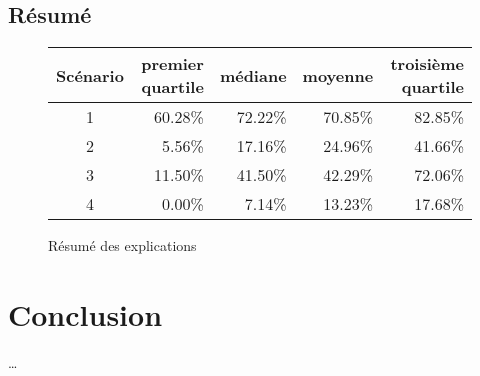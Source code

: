 \documentclass[]{article}
\begin{document}
\subsection{Résumé}

\begin{figure}[h]
\begin{center}
\begin{tabular}{|c|r|r|r|r|}
\hline
Scénario&premier quartile&médiane&moyenne&troisième quartile\\
\hline
1&60.28\%&72.22\%&70.85\%&82.85\%\\
\hline
2&5.56\%&17.16\%&24.96\%&41.66\%\\
\hline
3&11.50\%&41.50\%&42.29\%&72.06\%\\
\hline
4&0.00\%&7.14\%&13.23\%&17.68\%\\
\hline
\end{tabular}
\end{center}
\caption{Résumé des explications}
\end{figure}
\section{Conclusion}

\ldots{}
\end{document}
